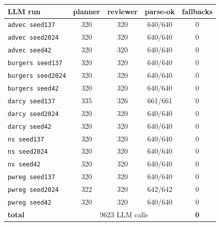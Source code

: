 \begin{tabular}{lcccc}
\toprule
LLM run & planner & reviewer & parse-ok & fallbacks \\
\midrule
\texttt{advec seed137} & 320 & 320 & 640/640 & 0 \\
\texttt{advec seed2024} & 320 & 320 & 640/640 & 0 \\
\texttt{advec seed42} & 320 & 320 & 640/640 & 0 \\
\texttt{burgers seed137} & 320 & 320 & 640/640 & 0 \\
\texttt{burgers seed2024} & 320 & 320 & 640/640 & 0 \\
\texttt{burgers seed42} & 320 & 320 & 640/640 & 0 \\
\texttt{darcy seed137} & 335 & 326 & 661/661 & 0 \\
\texttt{darcy seed2024} & 320 & 320 & 640/640 & 0 \\
\texttt{darcy seed42} & 320 & 320 & 640/640 & 0 \\
\texttt{ns seed137} & 320 & 320 & 640/640 & 0 \\
\texttt{ns seed2024} & 320 & 320 & 640/640 & 0 \\
\texttt{ns seed42} & 320 & 320 & 640/640 & 0 \\
\texttt{pwreg seed137} & 320 & 320 & 640/640 & 0 \\
\texttt{pwreg seed2024} & 322 & 320 & 642/642 & 0 \\
\texttt{pwreg seed42} & 320 & 320 & 640/640 & 0 \\
\midrule
\textbf{total} & \multicolumn{3}{c}{9623 LLM calls} & \textbf{0} \\
\bottomrule
\end{tabular}
